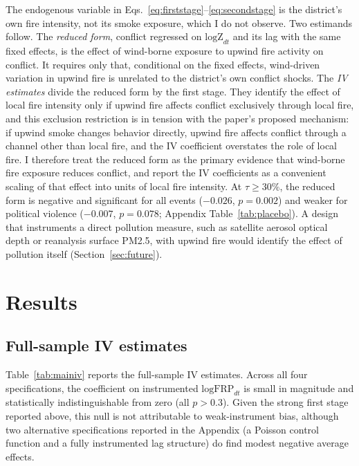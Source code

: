 \documentclass[12pt]{article}
\begin{document}
The endogenous variable in Eqs.~\eqref{eq:firststage}--\eqref{eq:secondstage} is the district's own fire intensity, not its smoke exposure, which I do not observe. Two estimands follow. The \emph{reduced form}, conflict regressed on $\text{logZ}_{dt}$ and its lag with the same fixed effects, is the effect of wind-borne exposure to upwind fire activity on conflict. It requires only that, conditional on the fixed effects, wind-driven variation in upwind fire is unrelated to the district's own conflict shocks. The \emph{IV estimates} divide the reduced form by the first stage. They identify the effect of local fire intensity only if upwind fire affects conflict exclusively through local fire, and this exclusion restriction is in tension with the paper's proposed mechanism: if upwind smoke changes behavior directly, upwind fire affects conflict through a channel other than local fire, and the IV coefficient overstates the role of local fire. I therefore treat the reduced form as the primary evidence that wind-borne fire exposure reduces conflict, and report the IV coefficients as a convenient scaling of that effect into units of local fire intensity. At $\tau \geq 30\%$, the reduced form is negative and significant for all events ($-0.026$, $p=0.002$) and weaker for political violence ($-0.007$, $p=0.078$; Appendix Table~\ref{tab:placebo}). A design that instruments a direct pollution measure, such as satellite aerosol optical depth or reanalysis surface PM2.5, with upwind fire would identify the effect of pollution itself (Section~\ref{sec:future}).

\section{Results}
\label{sec:results}

\subsection{Full-sample IV estimates}

Table~\ref{tab:mainiv} reports the full-sample IV estimates. Across all four specifications, the coefficient on instrumented $\text{logFRP}_{dt}$ is small in magnitude and statistically indistinguishable from zero (all $p>0.3$). Given the strong first stage reported above, this null is not attributable to weak-instrument bias, although two alternative specifications reported in the Appendix (a Poisson control function and a fully instrumented lag structure) do find modest negative average effects.
\end{document}

